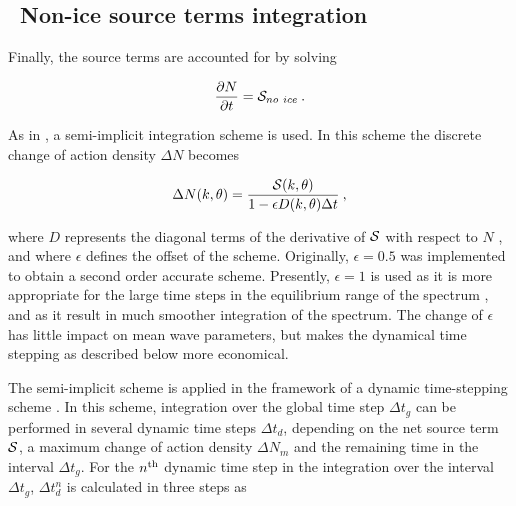 \vssub
\subsection{~Non-ice source terms integration} \label{sub:source}
\vssub

Finally, the source terms are accounted for by solving


\begin{equation}
\frac{\partial N}{\partial t} = {\cal S}_{no~ice} \: . \label{eq:step_source}
\end{equation}

\noindent 
As in \wam, a semi-implicit integration scheme is used. In this scheme the
discrete change of action density $\Delta N$ becomes \citep{art:WAM88}


\begin{equation}
\Delta N(k,\theta) = \frac{{\cal S}(k,\theta)}{1- \epsilon D(k,\theta)\Delta t}
\: , \label{eq:implicit_st} \end{equation}

\noindent 
where $D$ represents the diagonal terms of the derivative of ${\cal S}$ with
respect to $N$ \citep[Eqs. 4.1 through 4.10]{art:WAM88}, and where $\epsilon$
defines the offset of the scheme. Originally, $\epsilon = 0.5$ was implemented
to obtain a second order accurate scheme. Presently, $\epsilon = 1$ is used as
it is more appropriate for the large time steps in the equilibrium range of
the spectrum \citep{pro:HA98,art:HA01}, and as it result in much smoother
integration of the spectrum. The change of $\epsilon$ has little impact on
mean wave parameters, but makes the dynamical time stepping as described below
more economical.

The semi-implicit scheme is applied in the framework of a dynamic
time-stepping scheme \citep{tol:JPO92}. In this scheme, integration over the
global time step $\Delta t_g$ can be performed in several dynamic time steps
$\Delta t_d$, depending on the net source term ${\cal S}$, a maximum change of
action density $\Delta N_m$ and the remaining time in the interval $\Delta
t_g$. For the $n^{\rm th}$ dynamic time step in the integration over the
interval $\Delta t_g$, $\Delta t_d^n$ is calculated in three steps as



